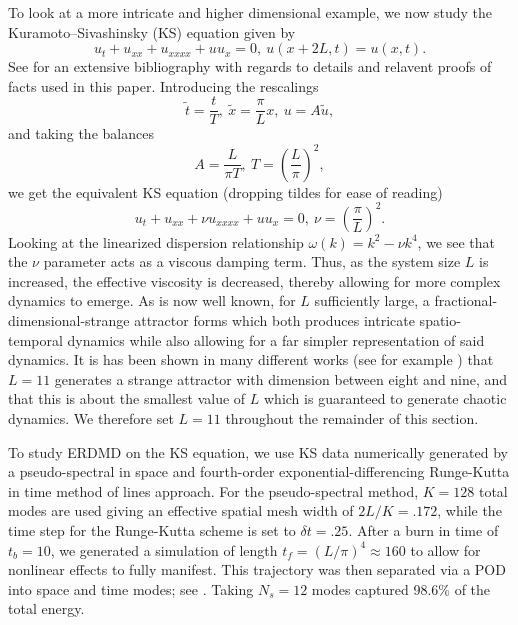 \documentclass[a4paper,11pt]{article}
\begin{document}
To look at a more intricate and higher dimensional example, we now study the Kuramoto--Sivashinsky (KS) equation given by 
\[
u_{t} + u_{xx} + u_{xxxx} + uu_{x} = 0, ~ u(x+2L,t) = u(x,t).
\]
See \cite{robinson} for an extensive bibliography with regards to details and relavent proofs of facts used in this paper.  Introducing the rescalings
\[
\tilde{t} =\frac{t}{T}, ~ \tilde{x} = \frac{\pi}{L}x, ~ u = A\tilde{u},
\]
and taking the balances
\[
A = \frac{L}{\pi T}, ~ T = \left(\frac{L}{\pi}\right)^{2}, 
\]
we get the equivalent KS equation (dropping tildes for ease of reading)
\[
u_{t} + u_{xx} + \nu u_{xxxx} + uu_{x} = 0, ~ \nu = \left(\frac{\pi}{L}\right)^{2}.
\]
Looking at the linearized dispersion relationship $\omega(k) = k^{2} - \nu k^{4}$, we see that the $\nu$ parameter acts as a viscous damping term.  Thus, as the system size $L$ is increased, the effective viscosity is decreased, thereby allowing for more complex dynamics to emerge.  As is now well known, for $L$ sufficiently large, a fractional-dimensional-strange attractor forms which both produces intricate spatio-temporal dynamics while also allowing for a far simpler representation of said dynamics.  It is has been shown in many different works (see for example \cite{citanovic}) that $L=11$ generates a strange attractor with dimension between eight and nine, and that this is about the smallest value of $L$ which is guaranteed to generate chaotic dynamics.  We therefore set $L=11$ throughout the remainder of this section.  

To study ERDMD on the KS equation, we use KS data numerically generated by a pseudo-spectral in space and fourth-order exponential-differencing Runge-Kutta in time method \cite{kassam} of lines approach.  For the pseudo-spectral method, $K=128$ total modes are used giving an effective spatial mesh width of $2L/K = .172$, while the time step for the Runge-Kutta scheme is set to $\delta t = .25$.  After a burn in time of $t_{b}=10$, we generated a simulation of length $t_{f} = \left(L/\pi\right)^{4}\approx 160$ to allow for nonlinear effects to fully manifest.  This trajectory was then separated via a POD into space and time modes; see \cite{berkooz}.  Taking $N_{s}=12$ modes captured 98.6\% of the total energy.  
\end{document}
